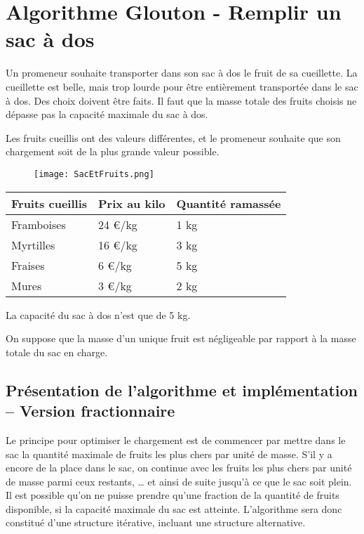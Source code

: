 
\section*{Algorithme Glouton - Remplir un sac à dos}

Un promeneur souhaite transporter dans son sac à dos le fruit de sa cueillette. La cueillette est belle, mais trop lourde pour être entièrement transportée dans le sac à dos. Des choix doivent être faits. Il faut que la masse totale des fruits choisis ne dépasse pas la capacité maximale du sac à dos.

Les fruits cueillis ont des valeurs différentes, et le promeneur souhaite que son chargement soit de la plus grande valeur possible.

\begin{figure}[h]
	\centering
		\texttt{[image: SacEtFruits.png]}
	\label{fig:SacEtFruits}
\end{figure}



\begin{table}[h]
	\centering
		\begin{tabular}{lll}
\hline
\textbf{Fruits cueillis} & \textbf{Prix au kilo} & \textbf{Quantité ramassée}\\
\hline
Framboises& 24 €/kg  & 1 kg \\
Myrtilles & 16 €/kg & 3 kg  \\
Fraises & 6 €/kg & 5 kg \\
Mures & 3 €/kg & 2 kg \\
\hline
		\end{tabular}
	\label{tab_fruit}
\end{table}

La capacité du sac à dos n’est que de 5 kg.

On suppose que la masse d’un unique fruit est négligeable par rapport à la masse totale du sac en charge.

\subsection*{Présentation de l’algorithme et implémentation -- Version fractionnaire}
\label{sec:PrésentationDeLAlgorithmeEtImplémentation}

Le principe pour optimiser le chargement est de commencer par mettre dans le sac la quantité maximale de fruits les plus chers par unité de masse. S'il y a encore de la place dans le sac, on continue avec les fruits les plus chers par unité de masse parmi ceux restants, … et ainsi de suite jusqu'à ce que le sac soit plein.\\
Il est possible qu'on ne puisse prendre qu'une fraction de la quantité de fruits disponible, si la capacité maximale du sac est atteinte. L'algorithme sera donc constitué d'une structure itérative, incluant une structure alternative.\\


